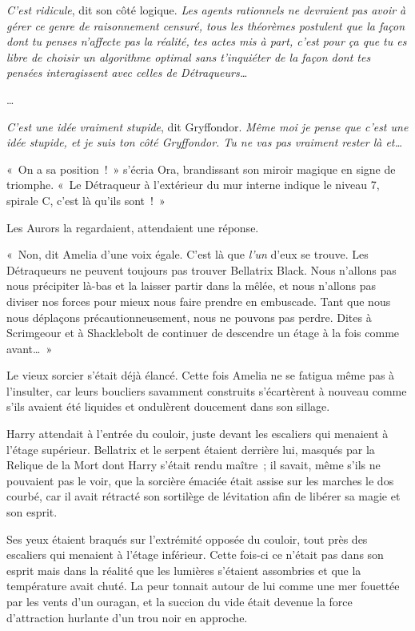 \emph{C'est ridicule}, dit son côté logique.
\emph{Les agents rationnels ne devraient pas avoir à gérer ce genre de raisonnement censuré, tous les théorèmes postulent que la façon dont tu penses n'affecte pas la réalité, tes actes mis à part, c'est pour ça que tu es libre de choisir un algorithme optimal sans t'inquiéter de la façon dont tes pensées interagissent avec celles de Détraqueurs…}

…

\emph{C'est une idée vraiment stupide}, dit Gryffondor.
\emph{Même moi je pense que c'est une idée stupide, et je suis ton côté Gryffondor.
Tu ne vas pas vraiment rester là et…}

\later

«~On a sa position~!~»
s'écria Ora, brandissant son miroir magique en signe de triomphe.
«~Le Détraqueur à l'extérieur du mur interne indique le niveau 7, spirale C, c'est là qu'ils sont~!~»

Les Aurors la regardaient, attendaient une réponse.

«~Non, dit Amelia d'une voix égale.
C'est là que \emph{l'un} d'eux se trouve.
Les Détraqueurs ne peuvent toujours pas trouver Bellatrix Black.
Nous n'allons pas nous précipiter là-bas et la laisser partir dans la mêlée, et nous n'allons pas diviser nos forces pour mieux nous faire prendre en embuscade.
Tant que nous nous déplaçons précautionneusement, nous ne pouvons pas perdre.
Dites à Scrimgeour et à Shacklebolt de continuer de descendre un étage à la fois comme avant…~»

Le vieux sorcier s'était déjà élancé.
Cette fois Amelia ne se fatigua même pas à l'insulter, car leurs boucliers savamment construits s'écartèrent à nouveau comme s'ils avaient été liquides et ondulèrent doucement dans son sillage.

\later

Harry attendait à l'entrée du couloir, juste devant les escaliers qui menaient à l'étage supérieur.
Bellatrix et le serpent étaient derrière lui, masqués par la Relique de la Mort dont Harry s'était rendu maître~; il savait, même s'ils ne pouvaient pas le voir, que la sorcière émaciée était assise sur les marches le dos courbé, car il avait rétracté son sortilège de lévitation afin de libérer sa magie et son esprit.

Ses yeux étaient braqués sur l'extrémité opposée du couloir, tout près des escaliers qui menaient à l'étage inférieur.
Cette fois-ci ce n'était pas dans son esprit mais dans la réalité que les lumières s'étaient assombries et que la température avait chuté.
La peur tonnait autour de lui comme une mer fouettée par les vents d'un ouragan, et la succion du vide était devenue la force d'attraction hurlante d'un trou noir en approche.


